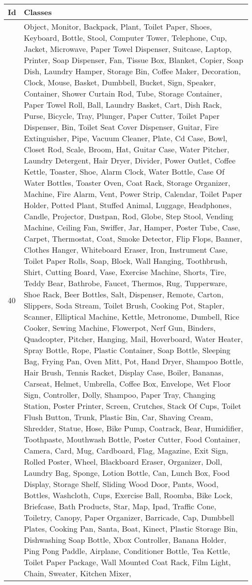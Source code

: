 	\begin{table}
	\begin{center}
		\begin{tabular}{ | l | p{17cm} |}
			\hline
			
			\cellcolor{purple!30}Id & \cellcolor{purple!30}Classes \\ \hline
			
			40 & Object, Monitor, Backpack, Plant, Toilet Paper, Shoes, Keyboard, Bottle, Stool, Computer Tower, Telephone, Cup, Jacket, Microwave, Paper Towel Dispenser, Suitcase, Laptop, Printer, Soap Dispenser, Fan, Tissue Box, Blanket, Copier, Soap Dish, Laundry Hamper, Storage Bin, Coffee Maker, Decoration, Clock, Mouse, Basket, Dumbbell, Bucket, Sign, Speaker, Container, Shower Curtain Rod, Tube, Storage Container, Paper Towel Roll, Ball, Laundry Basket, Cart, Dish Rack, Purse, Bicycle, Tray, Plunger, Paper Cutter, Toilet Paper Dispenser, Bin, Toilet Seat Cover Dispenser, Guitar, Fire Extinguisher, Pipe, Vacuum Cleaner, Plate, Cd Case, Bowl, Closet Rod, Scale, Broom, Hat, Guitar Case, Water Pitcher, Laundry Detergent, Hair Dryer, Divider, Power Outlet, Coffee Kettle, Toaster, Shoe, Alarm Clock, Water Bottle, Case Of Water Bottles, Toaster Oven, Coat Rack, Storage Organizer, Machine, Fire Alarm, Vent, Power Strip, Calendar, Toilet Paper Holder, Potted Plant, Stuffed Animal, Luggage, Headphones, Candle, Projector, Dustpan, Rod, Globe, Step Stool, Vending Machine, Ceiling Fan, Swiffer, Jar, Hamper, Poster Tube, Case, Carpet, Thermostat, Coat, Smoke Detector, Flip Flops, Banner, Clothes Hanger, Whiteboard Eraser, Iron, Instrument Case, Toilet Paper Rolls, Soap, Block, Wall Hanging, Toothbrush, Shirt, Cutting Board, Vase, Exercise Machine, Shorts, Tire, Teddy Bear, Bathrobe, Faucet, Thermos, Rug, Tupperware, Shoe Rack, Beer Bottles, Salt, Dispenser, Remote, Carton, Slippers, Soda Stream, Toilet Brush, Cooking Pot, Stapler, Scanner, Elliptical Machine, Kettle, Metronome, Dumbell, Rice Cooker, Sewing Machine, Flowerpot, Nerf Gun, Binders, Quadcopter, Pitcher, Hanging, Mail, Hoverboard, Water Heater, Spray Bottle, Rope, Plastic Container, Soap Bottle, Sleeping Bag, Frying Pan, Oven Mitt, Pot, Hand Dryer, Shampoo Bottle, Hair Brush, Tennis Racket, Display Case, Boiler, Bananas, Carseat, Helmet, Umbrella, Coffee Box, Envelope, Wet Floor Sign, Controller, Dolly, Shampoo, Paper Tray, Changing Station, Poster Printer, Screen, Crutches, Stack Of Cups, Toilet Flush Button, Trunk, Plastic Bin, Car, Shaving Cream, Shredder, Statue, Hose, Bike Pump, Coatrack, Bear, Humidifier, Toothpaste, Mouthwash Bottle, Poster Cutter, Food Container, Camera, Card, Mug, Cardboard, Flag, Magazine, Exit Sign, Rolled Poster, Wheel, Blackboard Eraser, Organizer, Doll, Laundry Bag, Sponge, Lotion Bottle, Can, Lunch Box, Food Display, Storage Shelf, Sliding Wood Door, Pants, Wood, Bottles, Washcloth, Cups, Exercise Ball, Roomba, Bike Lock, Briefcase, Bath Products, Star, Map, Ipad, Traffic Cone, Toiletry, Canopy, Paper Organizer, Barricade, Cap, Dumbbell Plates, Cooking Pan, Santa, Boat, Kinect, Plastic Storage Bin, Dishwashing Soap Bottle, Xbox Controller, Banana Holder, Ping Pong Paddle, Airplane, Conditioner Bottle, Tea Kettle, Toilet Paper Package, Wall Mounted Coat Rack, Film Light, Chain, Sweater, Kitchen Mixer, 
\end{tabular}
\end{center}
\end{table}
